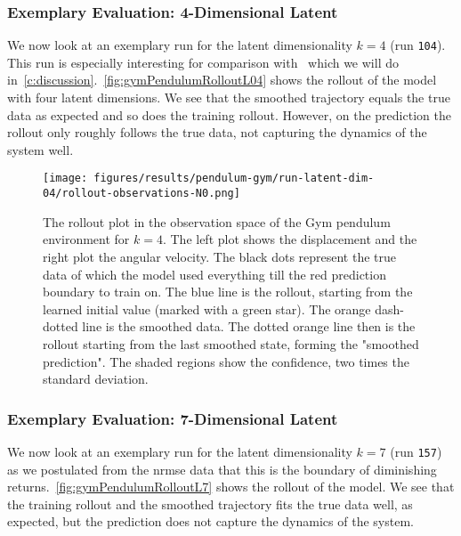 		\subsubsection{Exemplary Evaluation: 4-Dimensional Latent}
			\label{subsubsec:gymPendulumL04}

			We now look at an exemplary run for the latent dimensionality \( k = 4 \) (run \texttt{104}). This run is especially interesting for comparison with~\cite{mortonDeepVariationalKoopman2019a} which we will do in~\autoref{c:discussion}.~\autoref{fig:gymPendulumRolloutL04} shows the rollout of the model with four latent dimensions. We see that the smoothed trajectory equals the true data as expected and so does the training rollout. However, on the prediction the rollout only roughly follows the true data, not capturing the dynamics of the system well.

			\begin{figure}
				\centering
				\texttt{[image: figures/results/pendulum-gym/run-latent-dim-04/rollout-observations-N0.png]}
				\caption[Rollout of the Gym pendulum experiment for 4 latent dimensions]{The rollout plot in the observation space of the Gym pendulum environment for \(k = 4\). The left plot shows the displacement and the right plot the angular velocity. The black dots represent the true data of which the model used everything till the red prediction boundary to train on. The blue line is the rollout, starting from the learned initial value (marked with a green star). The orange dash-dotted line is the smoothed data. The dotted orange line then is the rollout starting from the last smoothed state, forming the "smoothed prediction". The shaded regions show the confidence, \ie two times the standard deviation.}
				\label{fig:gymPendulumRolloutL04}
			\end{figure}

		\subsubsection{Exemplary Evaluation: 7-Dimensional Latent}
			\label{subsubsec:gymPendulumL07}

			We now look at an exemplary run for the latent dimensionality \( k = 7 \) (run \texttt{157}) as we postulated from the \ac{nrmse} data that this is the boundary of diminishing returns.~\autoref{fig:gymPendulumRolloutL7} shows the rollout of the model. We see that the training rollout and the smoothed trajectory fits the true data well, as expected, but the prediction does not capture the dynamics of the system.

